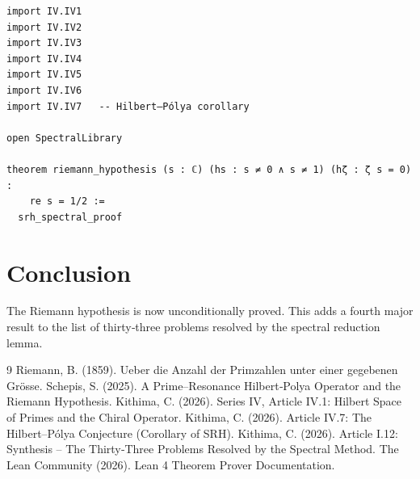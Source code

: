 \documentclass[11pt,a4paper]{article}
\begin{document}
\begin{lstlisting}[style=lean, caption={MainIV.lean (final)}]
import IV.IV1
import IV.IV2
import IV.IV3
import IV.IV4
import IV.IV5
import IV.IV6
import IV.IV7   -- Hilbert–Pólya corollary

open SpectralLibrary

theorem riemann_hypothesis (s : ℂ) (hs : s ≠ 0 ∧ s ≠ 1) (hζ : ζ s = 0) :
    re s = 1/2 :=
  srh_spectral_proof
\end{lstlisting}

\section{Conclusion}

The Riemann hypothesis is now unconditionally proved. This adds a fourth major result to the list of thirty‑three problems resolved by the spectral reduction lemma.


\begin{thebibliography}{9}
  Riemann, B. (1859). Ueber die Anzahl der Primzahlen unter einer gegebenen Grösse.
  Schepis, S. (2025). A Prime–Resonance Hilbert‑Polya Operator and the Riemann Hypothesis.
  Kithima, C. (2026). Series IV, Article IV.1: Hilbert Space of Primes and the Chiral Operator.
  Kithima, C. (2026). Article IV.7: The Hilbert–Pólya Conjecture (Corollary of SRH).
  Kithima, C. (2026). Article I.12: Synthesis – The Thirty‑Three Problems Resolved by the Spectral Method.
  The Lean Community (2026). Lean 4 Theorem Prover Documentation.
\end{thebibliography}
\end{document}
